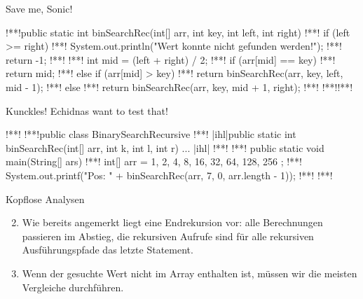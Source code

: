 {\begin{frame}[fragile,c]{Save me, Sonic!}
\begin{plainjava}
!**!public static int binSearchRec(int[] arr, int key, int left, int right) {
!**!    if (left >= right) {
!**!        System.out.println("Wert konnte nicht gefunden werden!");
!**!        return -1;
!**!    }
!**!    int mid = (left + right) / 2;
!**!    if (arr[mid] == key) {
!**!        return mid;
!**!    } else if (arr[mid] > key) {
!**!        return binSearchRec(arr, key, left, mid - 1);
!**!    } else {
!**!        return binSearchRec(arr, key, mid + 1, right);
!**!    }
!**!}!**!
\end{plainjava}
\end{frame}
\begin{frame}[fragile,c]{Kunckles! Echidnas want to test that!}
\SetupLstHl
\begin{plainjava}
!**!
!**!public class BinarySearchRecursive {
!**!   |ihl|public static int binSearchRec(int[] arr, int k, int l, int r) { ... } |ihl|
!**!
!**!   public static void main(String[] ars) {
!**!      int[] arr = { 1, 2, 4, 8, 16, 32, 64, 128, 256 };
!**!      System.out.printf("Pos: " + binSearchRec(arr, 7, 0, arr.length - 1));
!**!   }
!**!}
\end{plainjava}
\end{frame}

\begin{frame}[c]{Kopflose Analysen}
\begin{enumerate}[<+(1)->]
    \setcounter{enumi}{1}
    \itemsep12pt
    \item {}\pause
    Wie bereits angemerkt liegt eine Endrekursion vor: \pause alle Berechnungen passieren im Abstieg, die rekursiven Aufrufe sind für alle rekursiven Ausführungspfade das letzte Statement.
    \item {}\pause
    Wenn der gesuchte Wert nicht im Array enthalten ist, müssen wir die meisten Vergleiche durchführen.\pause {}
\end{enumerate}
\end{frame}

}
